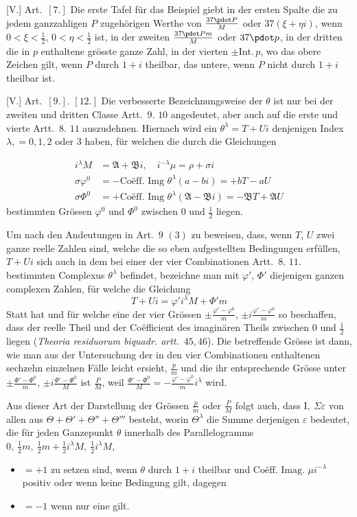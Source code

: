 [V.] Art.\ $[7.]$ Die erste Tafel für das Beispiel giebt in der ersten Spalte die zu jedem ganzzahligen $P$ zugehörigen Werthe von $\frac{37\pdot P}{M}$ oder $37(\xi+\eta i)$, wenn $0<\xi<\tfrac12$, $0<\eta<\tfrac12$ ist, in der zweiten $\frac{37\pdot Pm}{M}$ oder $37\pdot p$, in der dritten die in $p$ enthaltene grösste ganze Zahl, in der vierten $\pm\mathrm{Int.}\,p$, wo das obere Zeichen gilt, wenn $P$ durch $1+i$ theilbar, das untere, wenn $P$ nicht durch $1+i$ theilbar ist.

[V.] Art.\ $[9.]$. $[12.]$ Die verbesserte Bezeichnungsweise der $\theta$ ist nur bei der zweiten und dritten Classe Artt.\ $9$. $10$ angedeutet, aber auch auf die erste und vierte Artt.\ $8$. $11$ auszudehnen. Hiernach wird ein $\theta^\lambda=T+Ui$ denjenigen Index $\lambda,=0,1,2$ oder $3$ haben, für welchen die durch die Gleichungen

%
\[
\begin{aligned}
i^\lambda M&=\mathfrak A+\mathfrak B i,\quad i^{-\lambda}\mu=\rho+\sigma i\\
\sigma\varphi^0&=-\text{Coëff. Img }\theta^\lambda(a-bi)=+bT-aU\\
\sigma\Phi^0&=+\text{Coëff. Img }\theta^\lambda(\mathfrak A-\mathfrak B i)=-\mathfrak B T+\mathfrak A U
\end{aligned}
\]
bestimmten Grössen $\varphi^0$ und $\Phi^0$ zwischen $0$ und $\tfrac12$ liegen.

Um nach den Andeutungen in Art.\ $9$ $(3)$ zu beweisen, dass, wenn $T$, $U$ zwei ganze reelle Zahlen sind, welche die so eben aufgestellten Bedingungen erfüllen, $T+Ui$ sich auch in dem bei einer der vier Combinationen Artt.\ $8$. $11$. bestimmten Complexus $\theta^\lambda$ befindet, bezeichne man mit $\varphi'$, $\Phi'$ diejenigen ganzen complexen Zahlen, für welche die Gleichung
\[
T+Ui=\varphi'i^\lambda M+\Phi'm
\]
Statt hat und für welche eine der vier Grössen $\pm\frac{\varphi'-\varphi^0}{m}$, $\pm i\frac{\varphi'-\varphi^0}{m}$ so beschaffen, dass der reelle Theil und der Coëfficient des imaginären Theils zwischen $0$ und $\tfrac12$ liegen (\textit{Theoria residuorum biquadr. artt.}\ $45,46$). Die betreffende Grösse ist dann, wie man aus der Untersuchung der in den vier Combinationen enthaltenen sechzehn einzelnen Fälle leicht ersieht, $\frac pm$ und die ihr entsprechende Grösse unter $\pm\frac{\Phi'-\Phi^0}{m}$, $\pm i\frac{\Phi'-\Phi^0}{M}$ ist $\frac PM$, weil $\frac{\Phi'-\Phi^0}{M}=-\frac{\varphi'-\varphi^0}{m}i^\lambda$ wird.

Aus dieser Art der Darstellung der Grössen $\frac pm$ oder $\frac PM$ folgt auch, dass $\mathrm I,\ \Sigma\varepsilon$ von allen aus $\Theta+\Theta'+\Theta''+\Theta'''$ besteht, worin $\Theta^\lambda$ die Summe derjenigen $\varepsilon$ bedeutet, die für jeden Ganzepunkt $\theta$ innerhalb des Parallelogramms $0,\ \tfrac12m,\ \tfrac12m+\tfrac12i^\lambda M,\ \tfrac12i^\lambda M,$
\begin{itemize}
\item[] $=+1$ zu setzen sind, wenn $\theta$ durch $1+i$ theilbar und $\text{Coëff. Imag. }\mu i^{-\lambda}$ positiv oder wenn keine Bedingung gilt, dagegen
\item[] $=-1$ wenn nur eine gilt.
\end{itemize}

